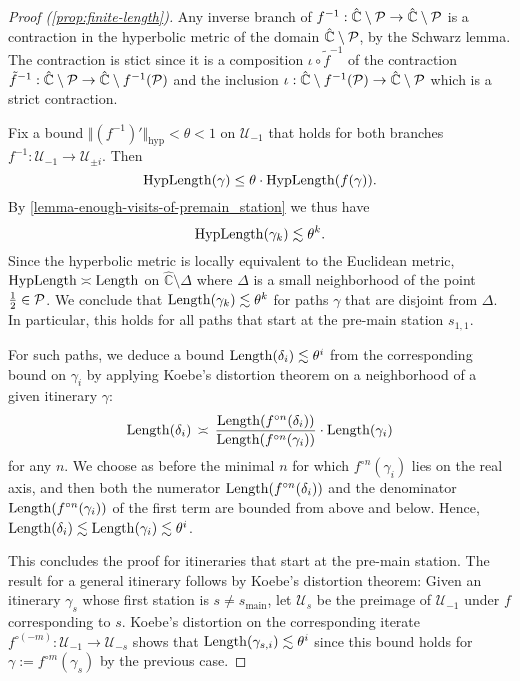 \begin{proof}[Proof (\cref{prop:finite-length})] Any inverse branch of $f^{-1}: \hat{\mathbb C} \setminus \operatorname{\mathcal P} \to \hat{\mathbb C} \setminus \operatorname{\mathcal P}$ is a contraction in the hyperbolic metric of the domain $\hat{\mathbb C} \setminus \operatorname{\mathcal P}$, by the Schwarz lemma. The contraction is stict since it is a composition $ \iota \circ \tilde f^{-1}$ of the contraction $\tilde f^{-1}:\hat{\mathbb C} \setminus \operatorname{\mathcal P} \to \hat{\mathbb C} \setminus f^{-1} (\operatorname{\mathcal P})$ and the inclusion $\iota: \hat{\mathbb C} \setminus f^{-1} (\operatorname{\mathcal P})  \to \hat{\mathbb C} \setminus \operatorname{\mathcal P}$ which is a strict contraction.
	
Fix a bound $\Vert (f^{-1})' \Vert _{\mathrm{hyp}}< \theta < 1$ on $\mathcal U_{-1}$ that holds for both branches $f^{-1}: \mathcal U_{-1} \to \mathcal U_{\pm i}$. Then 
$$\operatorname{HypLength}(\gamma) \leq \theta \cdot \operatorname{HypLength}(f(\gamma)).$$
By \cref{lemma-enough-visits-of-premain_station} we thus have 
$$\operatorname{HypLength}(\gamma_k) \lesssim \theta^k.$$
Since the hyperbolic metric is locally equivalent to the Euclidean metric, $\operatorname{HypLength} \asymp \operatorname{Length}$ on $\hat {\mathbb C} \setminus \Delta$ where $\Delta$ is a small neighborhood of the point $\tfrac 12 \in \operatorname{\mathcal P}$. 
We conclude that $\operatorname{Length}(\gamma_k) \lesssim \theta^k$ for paths $\gamma$ that are disjoint from $\Delta$. In particular, this holds for all paths that start at the pre-main station $s_{1,1}$.

For such paths, we deduce a bound $\operatorname{Length}(\delta_i) \lesssim \theta^i$ from the corresponding bound on $\gamma_i$
by applying Koebe's distortion theorem on a neighborhood of a given itinerary $\gamma$: 
$$\operatorname{Length}(\delta_i) \, \asymp \, \frac{\operatorname{Length}(f^{\circ n}(\delta_i))}{\operatorname{Length}(f^{\circ n}(\gamma_i))} \cdot \operatorname{Length}(\gamma_i)$$ for any $n$. We choose as before the minimal $n$ for which $f^{\circ n}(\gamma_i)$ lies on the real axis, and then both the numerator $\operatorname{Length}(f^{\circ n}(\delta_i))$ and the denominator $\operatorname{Length}(f^{\circ n}(\gamma_i))$ of the first term are bounded from above and below. Hence, $\operatorname{Length}(\delta_i) \lesssim \operatorname{Length}(\gamma_i) \lesssim \theta ^i$.
 
This concludes the proof for itineraries that start at the pre-main station. The result for a general itinerary follows by Koebe's distortion theorem: Given an itinerary $\gamma_s$ whose first station is $s \neq s_{\mathrm{main}}$, let $\mathcal U_s$ be the preimage of $\mathcal U_{-1}$ under $f$ corresponding to $s$. Koebe's distortion on the corresponding iterate $f^{\circ(-m)}: \mathcal U_{-1} \to \mathcal U_{-s}$ shows that $\operatorname{Length}(\gamma_{s,i}) \lesssim \theta ^i$ since this bound holds for $\gamma := f^{\circ m} (\gamma_s)$ by the previous case.
\end{proof}

